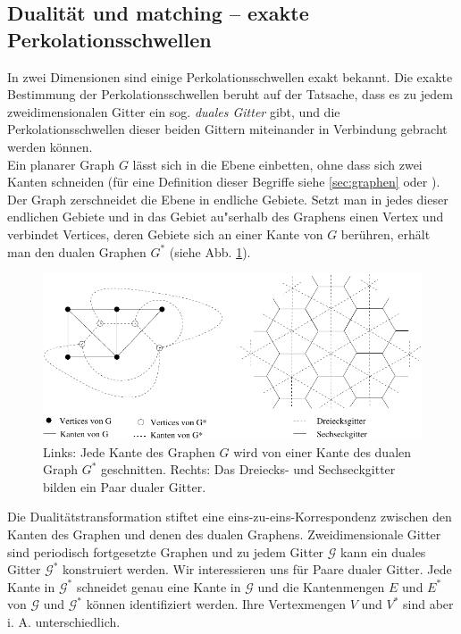 \subsection{Dualit\"at und matching -- exakte Perkolationsschwellen}
\label{sec:dualitaet}
In zwei Dimensionen sind einige Perkolationsschwellen exakt bekannt. Die exakte Bestimmung der Perkolationsschwellen beruht auf der Tatsache, dass es zu jedem zweidimensionalen Gitter ein sog. \textit{duales Gitter} gibt, und die Perkolationsschwellen dieser beiden Gittern miteinander in Verbindung gebracht werden k\"onnen. 
\\Ein planarer Graph $G$ l\"asst sich in die Ebene einbetten, ohne dass sich zwei Kanten schneiden (f\"ur eine Definition dieser Begriffe siehe \ref{sec:graphen} oder \cite{Essam:70}). Der Graph zerschneidet die Ebene in endliche Gebiete. Setzt man in jedes dieser endlichen Gebiete und in das Gebiet au"serhalb des Graphens einen Vertex und verbindet Vertices, deren Gebiete sich an einer Kante von $G$ ber\"uhren, erh\"alt man den dualen Graphen $G^*$ (siehe Abb. \ref{fig:dualgraph}).
\begin{figure}[htbp]
  \centering
  \includegraphics{./Einleitung-figs/dualgraph}
  \caption{Links: Jede Kante des Graphen $G$ wird von einer Kante des dualen Graph $G^*$ geschnitten. Rechts: Das Dreiecks- und Sechseckgitter bilden ein Paar dualer Gitter.}
  \label{fig:dualgraph}
\end{figure}
Die Dualit\"atstransformation stiftet eine eins-zu-eins-\-Korrespondenz zwischen den Kanten des Graphen und denen des dualen Graphens. Zweidimensionale Gitter sind periodisch fortgesetzte Graphen und zu jedem Gitter $\mathcal{G}$ kann ein duales Gitter $\mathcal{G}^*$ konstruiert werden. Wir interessieren uns f\"ur Paare dualer Gitter. Jede Kante in $\mathcal{G}^*$ schneidet genau eine Kante in $\mathcal{G}$ und die Kantenmengen $E$ und $E^*$ von $\mathcal{G}$ und $\mathcal{G}^*$ k\"onnen identifiziert werden. Ihre Vertexmengen $V$ und $V^*$ sind aber i. A. unterschiedlich.\\
